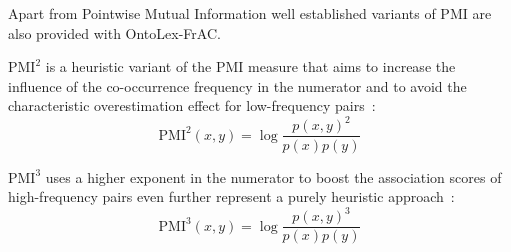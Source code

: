 \noindent
Apart from Pointwise Mutual Information well established variants of PMI are also provided 
with OntoLex-FrAC.


\begin{definition}\sloppy
$\text{PMI}^{2}$ is a heuristic variant of the PMI measure that aims to increase the influence 
of the co-occurrence frequency in the numerator and to avoid the characteristic overestimation
effect for low-frequency pairs~\citep{Role2011}:
\[\text{PMI}^{2}(x,y) = \log\frac{p(x,y)^{2}}{ p(x) p(y)}\] %
\end{definition}
    
\begin{definition}
$\text{PMI}^{3}$ uses a higher exponent in the numerator to boost the association 
scores of high-frequency pairs even further represent a purely heuristic approach~\citep{Role2011}:
\[\text{PMI}^{3}(x,y) = \log \frac{p(x,y) ^{3}}{p(x) p(y)}\] %
%  
\end{definition}


